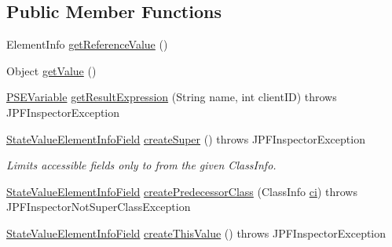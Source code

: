 \subsection*{Public Member Functions}
\begin{DoxyCompactItemize}
\item 
Element\+Info \hyperlink{classgov_1_1nasa_1_1jpf_1_1inspector_1_1server_1_1programstate_1_1_state_value_element_info_field_abd3e9c6bcff52f0e315e290d83acd4c5}{get\+Reference\+Value} ()
\item 
Object \hyperlink{classgov_1_1nasa_1_1jpf_1_1inspector_1_1server_1_1programstate_1_1_state_value_element_info_field_a366f15098313983b81871fbffce2cff8}{get\+Value} ()
\item 
\hyperlink{classgov_1_1nasa_1_1jpf_1_1inspector_1_1common_1_1pse_1_1_p_s_e_variable}{P\+S\+E\+Variable} \hyperlink{classgov_1_1nasa_1_1jpf_1_1inspector_1_1server_1_1programstate_1_1_state_value_element_info_field_aab7e6075fa9236d59f782f0906a7400c}{get\+Result\+Expression} (String name, int client\+ID)  throws J\+P\+F\+Inspector\+Exception 
\item 
\hyperlink{classgov_1_1nasa_1_1jpf_1_1inspector_1_1server_1_1programstate_1_1_state_value_element_info_field}{State\+Value\+Element\+Info\+Field} \hyperlink{classgov_1_1nasa_1_1jpf_1_1inspector_1_1server_1_1programstate_1_1_state_value_element_info_field_aaf0af8e4042599e6a3f70cd127e856a1}{create\+Super} ()  throws J\+P\+F\+Inspector\+Exception 
\begin{DoxyCompactList}\small\item\em Limits accessible fields only to from the given Class\+Info. \end{DoxyCompactList}\item 
\hyperlink{classgov_1_1nasa_1_1jpf_1_1inspector_1_1server_1_1programstate_1_1_state_value_element_info_field}{State\+Value\+Element\+Info\+Field} \hyperlink{classgov_1_1nasa_1_1jpf_1_1inspector_1_1server_1_1programstate_1_1_state_value_element_info_field_aaf2d7b4dd368db30e338c494195090db}{create\+Predecessor\+Class} (Class\+Info \hyperlink{classgov_1_1nasa_1_1jpf_1_1inspector_1_1server_1_1programstate_1_1_state_value_a0eb4aa1e630ed6372dcfb8c41ae7edc5}{ci})  throws J\+P\+F\+Inspector\+Not\+Super\+Class\+Exception 
\item 
\hyperlink{classgov_1_1nasa_1_1jpf_1_1inspector_1_1server_1_1programstate_1_1_state_value_element_info_field}{State\+Value\+Element\+Info\+Field} \hyperlink{classgov_1_1nasa_1_1jpf_1_1inspector_1_1server_1_1programstate_1_1_state_value_element_info_field_a569ace6662787e7578585418f4277747}{create\+This\+Value} ()  throws J\+P\+F\+Inspector\+Exception 

\end{DoxyCompactItemize}
